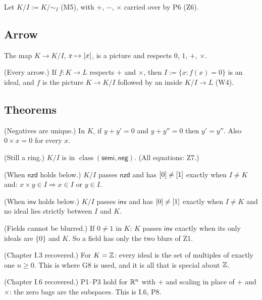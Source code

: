 \begin{lines}
\item[\lab{N1}] Let $K/I := K/{\sim_I}$ (M5), with $+$, $-$, $\times$ carried over by P6 (Z6).
\end{lines}

\subsection*{Arrow}

\begin{lines}
\item[\lab{P8}] The map $K \to K/I$, $x \mapsto [x]$, is a picture and respects $0$, $1$, $+$, $\times$.
\item[\lab{P9}] (Every arrow.) If $f : K \to L$ respects $+$ and $\times$, then $I := \{x : f(x) = 0\}$ is an ideal, and $f$ is the picture $K \to K/I$ followed by an inside $K/I \to L$ (W4).
\end{lines}

\subsection*{Theorems}

\begin{lines}
\item[\lab{T1}] (Negatives are unique.) In $K$, if $y + y' = 0$ and $y + y'' = 0$ then $y' = y''$. Also $0 \times x = 0$ for every $x$.
\item[\lab{T2}] (Still a ring.) $K/I$ is in $\operatorname{class}(\mathsf{semi}, \mathsf{neg})$. (All equations: Z7.)
\item[\lab{T3}] (When $\mathsf{nzd}$ holds below.) $K/I$ passes $\mathsf{nzd}$ and has $[0] \neq [1]$ exactly when $I \neq K$ and: $x \times y \in I \Rightarrow x \in I$ or $y \in I$.
\item[\lab{T4}] (When $\mathsf{inv}$ holds below.) $K/I$ passes $\mathsf{inv}$ and has $[0] \neq [1]$ exactly when $I \neq K$ and no ideal lies strictly between $I$ and $K$.
\item[\lab{T5}] (Fields cannot be blurred.) If $0 \neq 1$ in $K$: $K$ passes $\mathsf{inv}$ exactly when its only ideals are $\{0\}$ and $K$. So a field has only the two blurs of Z1.
\item[\lab{T6}] (Chapter I.3 recovered.) For $K = \mathbb{Z}$: every ideal is the set of multiples of exactly one $n \ge 0$. This is where G8 is used, and it is all that is special about $\mathbb{Z}$.
\item[\lab{T7}] (Chapter I.6 recovered.) P1--P3 hold for $\mathbb{R}^n$ with $+$ and scaling in place of $+$ and $\times$: the zero bags are the subspaces. This is I.6, P8.
\end{lines}


